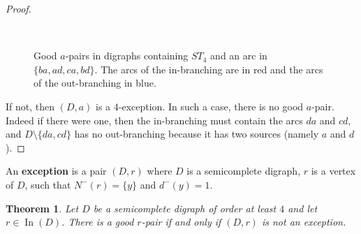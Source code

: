 \documentclass{article}
\newtheorem{theorem}{Theorem}
\theoremstyle{definition}
\newcommand{\ra}{\rightarrow}
\DeclareMathOperator{\In}{In}
\newcommand{\2}{\vspace{0.2cm}}
\begin{document}
\begin{proof}
\begin{figure}[H]
\begin{center}
\begin{tikzpicture}[scale=1]
\end{tikzpicture}
\hfill
{}
~~~
\caption{Good $a$-pairs in digraphs containing $ST_4$ and an arc in
  $\{ba, ad, ca, bd\}$. The arcs of the in-branching are in red and
  the arcs of the out-branching in blue.}\label{fig:ST4+}
\end{center}
\end{figure}
If not, then $(D,a)$ is a $4$-exception. In such a case, there is no
good $a$-pair. Indeed if there were one, then the in-branching must
contain the arcs $da$ and $cd$, and $D\setminus \{da,cd\}$ has no
out-branching because it has two sources (namely $a$ and $d$).
\end{proof}
 



An {\bf exception} is a pair $(D,r)$ where $D$ is a semicomplete
digraph, $r$ is a vertex of $D$, such that $N^-(r) = \{y\}$ and
$d^-(y) = 1$.


\begin{theorem}\label{nonEXCEPTION}
Let $D$ be a semicomplete digraph of order at least $4$ and let $r\in
\In(D)$.  There is a good $r$-pair if and only if $(D,r)$ is not an
exception.
\end{theorem}
\end{document}
